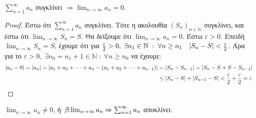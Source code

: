 \documentclass[a4paper,table]{report}
\begin{document}
\begin{mybox3}
  \begin{prop}
    $ \sum_{n=1}^{\infty} a_{n} $ συγκλίνει 
    $ \Rightarrow \lim_{n \to \infty} a_{n} = 0 $.
  \end{prop}
\end{mybox3}

\begin{proof}
\item {}
  Έστω ότι $ \sum_{n=1}^{\infty} a_{n} $ συγκλίνει. Τότε η ακολουθία $ (S_{n})_{n \in
  \mathbb{N}} $ συγκλίνει, και έστω ότι $ \lim_{n \to \infty} S_{n}=S $. Θα δείξουμε ότι
  $ \lim_{n \to \infty} a_{n}=0 $. Έστω $ \varepsilon >0 $. Επειδή $ \lim_{n \to \infty}
  S_{n} = S $, έχουμε ότι για $ \frac{\varepsilon}{2} >0, \; \exists n_{1} \in \mathbb{N}
  \; : \; \forall n \geq n_{1} \quad \abs{S_{n}-S} < \frac{\varepsilon}{2}$. Άρα 
  για το $ \varepsilon >0, \; \exists n_{0} = n_{1}+1 \in \mathbb{N} \; : \; \forall n
  \geq n_{0} $ να έχουμε:
  \begin{align*}
    \abs{a_{n} - 0} = \abs{a_{n}} = \abs{a_{1}+ a_{2}+ 
    \cdots + a_{n} - (a_{1}+ a_{2}+ \cdots + a_{n-1})} 
    &= \abs{S_{n}-S_{n-1}} = \abs{S_{n}-S+S-S_{n-1}} \\ 
    &\leq \abs{S_{n}-S} + \abs{S_{n-1}-S} < 
    \frac{\varepsilon}{2} + \frac{\varepsilon}{2} = \varepsilon 
  \end{align*} 
\end{proof}

\begin{cor}[Αντιθετοαντίστροφο]
    $ \lim_{n \to \infty} a_{n} \neq 0 $, ή $ \not \exists \lim_{n \to \infty} a_{n} 
    \Rightarrow \sum_{n=1}^{\infty} a_{n} $ αποκλίνει.
\end{cor}
\end{document}
